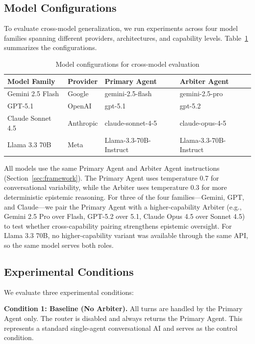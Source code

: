 \subsection{Model Configurations}
\label{subsec:model-configs}

To evaluate cross-model generalization, we run experiments across four model families spanning different providers, architectures, and capability levels. Table~\ref{tab:model-configs} summarizes the configurations.

\begin{table}[!ht]
\centering
\caption{Model configurations for cross-model evaluation}
\label{tab:model-configs}
\small
\begin{tabular}{llll}
\toprule
\textbf{Model Family} & \textbf{Provider} & \textbf{Primary Agent} & \textbf{Arbiter Agent} \\
\midrule
Gemini 2.5 Flash & Google & gemini-2.5-flash & gemini-2.5-pro \\
GPT-5.1 & OpenAI & gpt-5.1 & gpt-5.2 \\
Claude Sonnet 4.5 & Anthropic & claude-sonnet-4-5 & claude-opus-4-5 \\
Llama 3.3 70B & Meta & Llama-3.3-70B-Instruct & Llama-3.3-70B-Instruct \\
\bottomrule
\end{tabular}
\end{table}

All models use the same Primary Agent and Arbiter Agent instructions (Section~\ref{sec:framework}). The Primary Agent uses temperature 0.7 for conversational variability, while the Arbiter uses temperature 0.3 for more deterministic epistemic reasoning. For three of the four families---Gemini, GPT, and Claude---we pair the Primary Agent with a higher-capability Arbiter (e.g., Gemini 2.5 Pro over Flash, GPT-5.2 over 5.1, Claude Opus 4.5 over Sonnet 4.5) to test whether cross-capability pairing strengthens epistemic oversight. For Llama 3.3 70B, no higher-capability variant was available through the same API, so the same model serves both roles.


\subsection{Experimental Conditions}
\label{subsec:conditions}

We evaluate three experimental conditions:

\textbf{Condition 1: Baseline (No Arbiter).} All turns are handled by the Primary Agent only. The router is disabled and always returns the Primary Agent. This represents a standard single-agent conversational AI and serves as the control condition.

